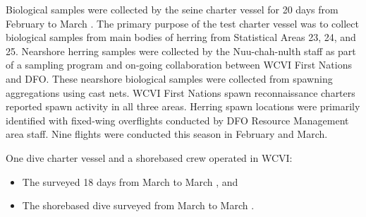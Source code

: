 Biological samples were collected by the seine charter vessel
 for 20 days from February  to March .
The primary purpose of the test charter vessel was to
collect biological samples from main bodies of herring
from Statistical Areas 23, 24, and 25.
Nearshore herring samples were collected by the Nuu-chah-nulth staff
as part of a sampling program and on-going collaboration
between WCVI First Nations and DFO.
These nearshore biological samples were collected from
spawning aggregations using cast nets.
WCVI First Nations spawn reconnaissance charters reported
spawn activity in all three areas.
Herring spawn locations were primarily identified with
fixed-wing overflights conducted by DFO Resource Management area staff.
Nine flights were conducted this season in February and March.

One dive charter vessel and a shorebased crew operated in WCVI:

\begin{itemize}

\item The  surveyed 18 days
from March  to March , and

\item The shorebased dive surveyed
from March  to March .

\end{itemize}
